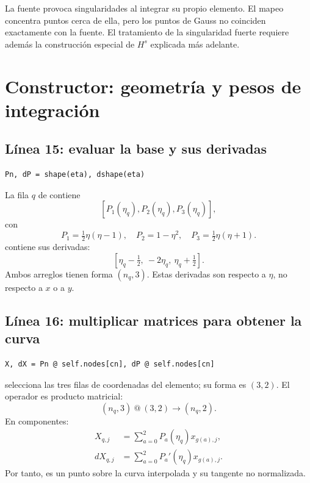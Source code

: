 \documentclass[11pt,a4paper]{article}
\numberwithin{equation}{section}
\DeclareRobustCommand{\code}[1]{\texttt{\detokenize{#1}}}
\begin{document}
La fuente provoca singularidades al integrar su propio elemento.
El mapeo concentra puntos cerca de ella, pero los puntos de Gauss
no coinciden exactamente con la fuente.
El tratamiento de la singularidad fuerte requiere adem\'as
la construcci\'on especial de $H^s$ explicada m\'as adelante.

\section{Constructor: geometr\'ia y pesos de integraci\'on}
\subsection{L\'inea 15: evaluar la base y sus derivadas}
\begin{lstlisting}
Pn, dP = shape(eta), dshape(eta)
\end{lstlisting}
La fila $q$ de \code{Pn} contiene
\begin{equation}
 \left[P_1(\eta_q),P_2(\eta_q),P_3(\eta_q)\right],
\end{equation}
con
\begin{equation}
 P_1=\tfrac12\eta(\eta-1),\quad P_2=1-\eta^2,\quad
 P_3=\tfrac12\eta(\eta+1).
\end{equation}
\code{dP} contiene sus derivadas:
\begin{equation}
 \left[\eta_q-\tfrac12,\ -2\eta_q,\ \eta_q+\tfrac12\right].
\end{equation}
Ambos arreglos tienen forma $(n_q,3)$.
Estas derivadas son respecto a $\eta$, no respecto a $x$ o a $y$.

\subsection{L\'inea 16: multiplicar matrices para obtener la curva}
\begin{lstlisting}
X, dX = Pn @ self.nodes[cn], dP @ self.nodes[cn]
\end{lstlisting}
\code{self.nodes[cn]} selecciona las tres filas de coordenadas del
elemento; su forma es $(3,2)$.
El operador \code{@} es producto matricial:
\begin{equation}
 (n_q,3)\ @\ (3,2)\longrightarrow(n_q,2).
\end{equation}
En componentes:
\begin{align}
 X_{q,j}&=\sum_{a=0}^2P_a(\eta_q)x_{g(a),j},\\
 dX_{q,j}&=\sum_{a=0}^2P_a'(\eta_q)x_{g(a),j}.
\end{align}
Por tanto, \code{X[q]} es un punto sobre la curva interpolada y
\code{dX[q]} su tangente no normalizada.
\end{document}
